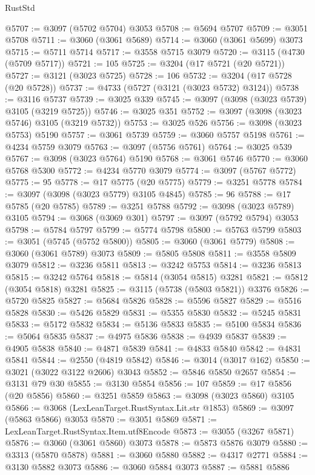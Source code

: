 \begin{lexlean}{RustStd}
\begin{coremodule}
{\begin{coremodule}
{{{{{{{{{{{{{{{{{{{{{{{{{{{{{{{{@5707 := @3097 (@5702 @5704) @3053
@5708 := @5694 @5707
@5709 := @3051 @5708
@5711 := @3060 (@3061 @5689)
@5714 := @3060 (@3061 @5699) @3073
@5715 := @5711 @5714
@5717 := @3558 @5715 @3079
@5720 := @3115 (@4730 (@5709 @5717))
@5721 := 105
@5725 := @3204 (@17 @5721 (@20 @5721))
@5727 := @3121 (@3023 @5725)
@5728 := 106
@5732 := @3204 (@17 @5728 (@20 @5728))
@5737 := @4733 (@5727 (@3121 (@3023 @5732) @3124))
@5738 := @3116 @5737
@5739 := @3025 @339
@5745 := @3097 (@3098 (@3023 @5739) @3105 (@3219 @5725))
@5746 := @3025 @351
@5752 := @3097 (@3098 (@3023 @5746) @3105 (@3219 @5732))
@5753 := @3025 @526
@5756 := @3098 (@3023 @5753) @5190
@5757 := @3061 @5739
@5759 := @3060 @5757 @5198
@5761 := @4234 @5759 @3079
@5763 := @3097 (@5756 @5761)
@5764 := @3025 @539
@5767 := @3098 (@3023 @5764) @5190
@5768 := @3061 @5746
@5770 := @3060 @5768 @5300
@5772 := @4234 @5770 @3079
@5774 := @3097 (@5767 @5772)
@5775 := 95
@5778 := @17 @5775 (@20 @5775)
@5779 := @3251 @5778
@5784 := @3097 (@3098 (@3023 @5779) @3105 @4845)
@5785 := 96
@5788 := @17 @5785 (@20 @5785)
@5789 := @3251 @5788
@5792 := @3098 (@3023 @5789) @3105
@5794 := @3068 (@3069 @301)
@5797 := @3097 (@5792 @5794) @3053
@5798 := @5784 @5797
@5799 := @5774 @5798
@5800 := @5763 @5799
@5803 := @3051 (@5745 (@5752 @5800))
@5805 := @3060 (@3061 @5779)
@5808 := @3060 (@3061 @5789) @3073
@5809 := @5805 @5808
@5811 := @3558 @5809 @3079
@5812 := @3236 @5811
@5813 := @3242 @5753
@5814 := @3236 @5813
@5815 := @3242 @5764
@5818 := @5814 (@3054 @5815) @3281
@5821 := @5812 (@3054 @5818) @3281
@5825 := @3115 (@5738 (@5803 @5821)) @3376
@5826 := @5720 @5825
@5827 := @5684 @5826
@5828 := @5596 @5827
@5829 := @5516 @5828
@5830 := @5426 @5829
@5831 := @5355 @5830
@5832 := @5245 @5831
@5833 := @5172 @5832
@5834 := @5136 @5833
@5835 := @5100 @5834
@5836 := @5064 @5835
@5837 := @4975 @5836
@5838 := @4939 @5837
@5839 := @4905 @5838
@5840 := @4871 @5839
@5841 := @4833 @5840
@5842 := @4831 @5841
@5844 := @2550 (@4819 @5842)
@5846 := @3014 (@3017 @162)
@5850 := @3021 (@3022 @3122 @2606) @3043
@5852 := @5846 @5850 @2657
@5854 := @3131 @79 @30
@5855 := @3130 @5854
@5856 := 107
@5859 := @17 @5856 (@20 @5856)
@5860 := @3251 @5859
@5863 := @3098 (@3023 @5860) @3105
@5866 := @3068 (LexLeanTarget.RustSyntax.Lit.str @1853)
@5869 := @3097 (@5863 @5866) @3053
@5870 := @3051 @5869
@5871 := LexLeanTarget.RustSyntax.Item.utf8Encode
@5873 := @3055 (@3267 @5871)
@5876 := @3060 (@3061 @5860) @3073
@5878 := @5873 @5876 @3079
@5880 := @3313 (@5870 @5878)
@5881 := @3060 @5880
@5882 := @4317 @2771
@5884 := @3130 @5882 @3073
@5886 := @3060 @5884 @3073
@5887 := @5881 @5886
}}}}}}}}}}}}}}}}}}}}}}}}}}}}}}}}
\end{coremodule}}
\end{coremodule}
\end{lexlean}
